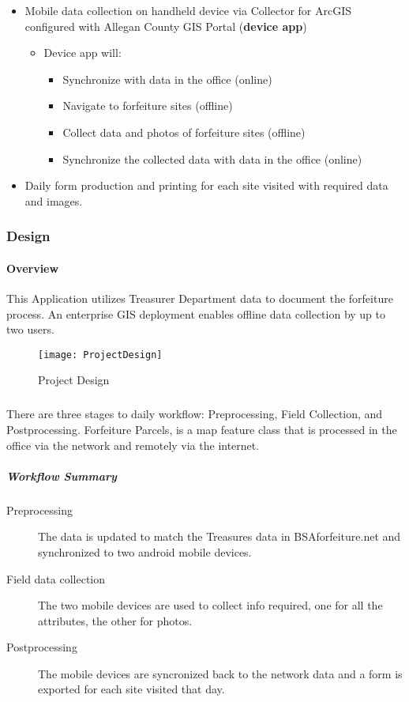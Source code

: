 \documentclass[class=article , crop=false, titlepage, twoside, multi={itemize, figure, verbatim}, float=false]{standalone}
\begin{document}
\begin{itemize} %

\item Mobile data collection on handheld device via Collector for ArcGIS configured with Allegan County GIS Portal  (\textbf{device app})

\begin{itemize} %

\item Device app will:

\begin{itemize} %

\item Synchronize with data in the office (online)
\item Navigate to forfeiture sites (offline)
\item Collect data and photos of forfeiture sites (offline)
\item Synchronize the collected data with data in the office (online)
\end{itemize} %

\end{itemize} %

\item Daily form production and printing for each site visited with required data and images.

\end{itemize} %

\clearpage
\subsubsection{Design}
\paragraph{Overview}This Application utilizes Treasurer Department data to document the forfeiture process.  An enterprise GIS deployment enables offline data collection by up to two users.
\begin{figure}[h!]
\centering
    \texttt{[image: ProjectDesign]}
\caption{Project Design}
\end{figure}
\subparagraph*{}There are three stages to daily workflow: Preprocessing, Field Collection, and Postprocessing.  Forfeiture Parcels, is a map feature class that is processed in the office via the network and remotely via the internet.
\clearpage
\subparagraph{Workflow Summary}
\begin{description}
\item [Preprocessing] The data is updated to match the Treasures data in BSAforfeiture.net and synchronized to two android mobile devices.
\item [Field data collection] The two mobile devices are used to collect info required, one for all the attributes, the other for photos.
\item[Postprocessing] The mobile devices are syncronized back to the network data and a form is exported for each site visited that day.
\end{description}
\end{document}
